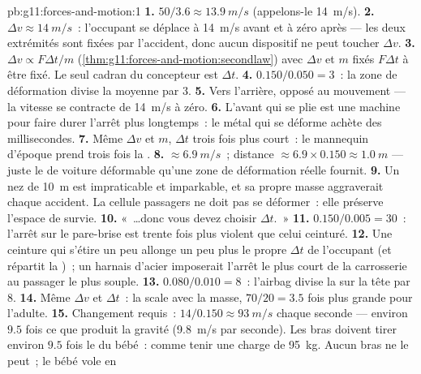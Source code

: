 \begin{solution}{pb:g11:forces-and-motion:1}
\textbf{1.} $50/3.6 \approx \qty{13.9}{m/s}$ (appelons-le \qty{14}{m/s}).
\textbf{2.} $\Delta v \approx \qty{14}{m/s}$~: l'occupant se déplace à
\qty{14}{m/s} avant et à zéro après --- les deux extrémités sont
fixées par l'accident, donc aucun dispositif ne peut toucher
$\Delta v$.
\textbf{3.} $\Delta v \propto F\Delta t/m$
(\cref{thm:g11:forces-and-motion:secondlaw}) avec $\Delta v$ et $m$
fixés  $F\Delta t$ à être fixé. Le seul cadran du concepteur est
$\Delta t$.
\textbf{4.} $0.150/0.050 = 3$~: la zone de déformation divise la
 moyenne par $3$.
\textbf{5.} Vers l'arrière, opposé au mouvement --- la vitesse se
contracte de \qty{14}{m/s} à zéro.
\textbf{6.} L'avant qui se plie est une machine pour faire durer
l'arrêt plus longtemps~: le métal qui se déforme achète des
millisecondes.
\textbf{7.} Même $\Delta v$ et $m$, $\Delta t$ trois fois plus court~:
le mannequin d'époque prend trois fois la
.
\textbf{8.} 
$\approx \qty{6.9}{m/s}$~; distance $\approx 6.9 \times 0.150 \approx
\qty{1.0}{m}$ --- juste le  de
voiture déformable qu'une zone de déformation réelle fournit.
\textbf{9.} Un nez de \qty{10}{m} est impraticable et
imparkable, et sa propre masse aggraverait chaque accident. La cellule
passagers ne doit pas se déformer~: elle préserve l'espace de survie.
\textbf{10.} «~\dots donc vous devez choisir $\Delta t$.~»
\textbf{11.} $0.150/0.005 = 30$~: l'arrêt sur le pare-brise est trente
fois plus violent que celui ceinturé.
\textbf{12.} Une ceinture qui s'étire un peu allonge un peu plus le
propre $\Delta t$ de l'occupant (et répartit la
)~; un harnais d'acier imposerait
l'arrêt le plus court de la carrosserie au passager le plus souple.
\textbf{13.} $0.080/0.010 = 8$~: l'airbag divise la
 sur la tête par $8$.
\textbf{14.} Même $\Delta v$ et $\Delta t$~: la
 scale avec la masse,
$70/20 = 3.5$ fois plus grande pour l'adulte.
\textbf{15.} Changement requis~: $14/0.150 \approx \qty{93}{m/s}$
chaque seconde --- environ $9.5$ fois ce que produit la gravité
(\qty{9.8}{m/s} par seconde). Les bras doivent tirer environ $9.5$
fois le  du bébé~: comme tenir
une charge de \qty{95}{kg}. Aucun bras ne le peut~; le bébé vole en

\end{solution}
